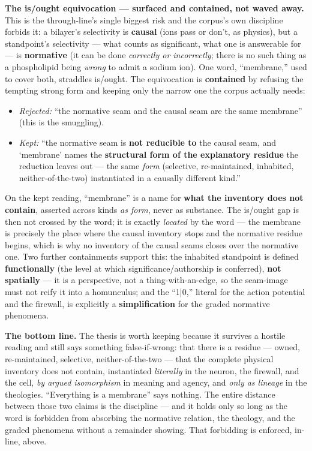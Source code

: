 \documentclass[11pt]{article}
\begin{document}
\textbf{The is/\allowbreak{}ought equivocation — surfaced and contained, not waved away.} This is the through-line's single biggest risk and the corpus's own discipline forbids it: a bilayer's selectivity is \textbf{causal} (ions pass or don't, as physics), but a standpoint's selectivity — what counts as significant, what one is answerable for — is \textbf{normative} (it can be done \emph{correctly or incorrectly}; there is no such thing as a phospholipid being \emph{wrong} to admit a sodium ion). One word, ``membrane,'' used to cover both, straddles is/\allowbreak{}ought. The equivocation is \textbf{contained} by refusing the tempting strong form and keeping only the narrow one the corpus actually needs:

\begin{itemize}
\item \emph{Rejected:} ``the normative seam and the causal seam are the same membrane'' (this is the smuggling).
\item \emph{Kept:} ``the normative seam is \textbf{not reducible to} the causal seam, and `membrane' names the \textbf{structural form of the explanatory residue} the reduction leaves out — the same \emph{form} (selective, re-maintained, inhabited, neither-of-the-two) instantiated in a causally different kind.''
\end{itemize}

On the kept reading, ``membrane'' is a name for \textbf{what the inventory does not contain}, asserted across kinds \emph{as form}, never as substance. The is/\allowbreak{}ought gap is then not crossed by the word; it is exactly \emph{located} by the word — the membrane is precisely the place where the causal inventory stops and the normative residue begins, which is why no inventory of the causal seams closes over the normative one. Two further containments support this: the inhabited standpoint is defined \textbf{functionally} (the level at which significance/\allowbreak{}authorship is conferred), \textbf{not spatially} — it is a perspective, not a thing-with-an-edge, so the seam-image must not reify it into a homunculus; and the ``1|0,'' literal for the action potential and the firewall, is explicitly a \textbf{simplification} for the graded normative phenomena.

\textbf{The bottom line.} The thesis is worth keeping because it survives a hostile reading and still says something false-if-wrong: that there is a residue — owned, re-maintained, selective, neither-of-the-two — that the complete physical inventory does not contain, instantiated \emph{literally} in the neuron, the firewall, and the cell, \emph{by argued isomorphism} in meaning and agency, and \emph{only as lineage} in the theologies. ``Everything is a membrane'' says nothing. The entire distance between those two claims is the discipline — and it holds only so long as the word is forbidden from absorbing the normative relation, the theology, and the graded phenomena without a remainder showing. That forbidding is enforced, in-line, above.
\end{document}
